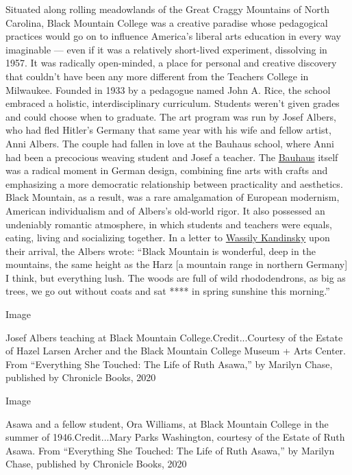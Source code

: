Situated along rolling meadowlands of the Great Craggy Mountains of
North Carolina, Black Mountain College was a creative paradise whose
pedagogical practices would go on to influence America's liberal arts
education in every way imaginable --- even if it was a relatively
short-lived experiment, dissolving in 1957. It was radically
open-minded, a place for personal and creative discovery that couldn't
have been any more different from the Teachers College in Milwaukee.
Founded in 1933 by a pedagogue named John A. Rice, the school embraced a
holistic, interdisciplinary curriculum. Students weren't given grades
and could choose when to graduate. The art program was run by Josef
Albers, who had fled Hitler's Germany that same year with his wife and
fellow artist, Anni Albers. The couple had fallen in love at the Bauhaus
school, where Anni had been a precocious weaving student and Josef a
teacher. The
\href{https://www.nytimes3xbfgragh.onion/2019/02/04/t-magazine/bauhaus-school-architecture-history.html}{Bauhaus}
itself was a radical moment in German design, combining fine arts with
crafts and emphasizing a more democratic relationship between
practicality and aesthetics. Black Mountain, as a result, was a rare
amalgamation of European modernism, American individualism and of
Albers's old-world rigor. It also possessed an undeniably romantic
atmosphere, in which students and teachers were equals, eating, living
and socializing together. In a letter to
\href{https://www.nytimes3xbfgragh.onion/2011/10/23/arts/artsspecial/kandinsky-painting-reveals-a-mystery-beneath.html}{Wassily
Kandinsky} upon their arrival, the Albers wrote: ``Black Mountain is
wonderful, deep in the mountains, the same height as the Harz {[}a
mountain range in northern Germany{]} I think, but everything lush. The
woods are full of wild rhododendrons, as big as trees, we go out without
coats and sat **** in spring sunshine this morning.''

Image

Josef Albers teaching at Black Mountain College.Credit...Courtesy of the
Estate of Hazel Larsen Archer and the Black Mountain College Museum +
Arts Center. From ``Everything She Touched: The Life of Ruth Asawa,'' by
Marilyn Chase, published by Chronicle Books, 2020

Image

Asawa and a fellow student, Ora Williams, at Black Mountain College in
the summer of 1946.Credit...Mary Parks Washington, courtesy of the
Estate of Ruth Asawa. From ``Everything She Touched: The Life of Ruth
Asawa,'' by Marilyn Chase, published by Chronicle Books, 2020

